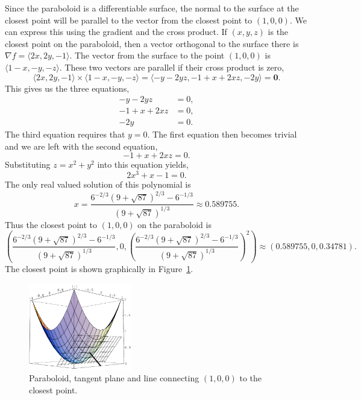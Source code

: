 \begin{Solution}
  \label{solution paraboloid closest point}
  Since the paraboloid is a differentiable surface, the normal to the surface
  at the closest point will be parallel to the vector from the closest
  point to $(1,0,0)$.  We can express this using the gradient and the 
  cross product.  If $(x,y,z)$ is the closest point on the paraboloid, then
  a vector orthogonal to the surface there is $\nabla f = \langle 2x,2y,-1 \rangle$.
  The vector from the surface to the point $(1,0,0)$ is $\langle 1-x,-y,-z \rangle$.
  These two vectors are parallel if their cross product is zero,
  \[
  \langle 2x,2y,-1 \rangle \times \langle 1-x,-y,-z \rangle 
  = \langle -y - 2 y z, -1 + x + 2 x z, -2 y \rangle = \mathbf{0}.
  \]
  This gives us the three equations,
  \begin{align*}
    -y - 2 y z &= 0, \\
    -1 + x + 2 x z &= 0, \\
    -2 y &= 0.
  \end{align*}
  The third equation requires that $y = 0$.  The first equation then becomes
  trivial and we are left with the second equation,
  \[
  -1 + x + 2 x z = 0.
  \]
  Substituting $z = x^2 + y^2$ into this equation yields,
  \[
  2 x^3 + x - 1 = 0.
  \]
  The only real valued solution of this polynomial is
  \[
  x = \frac{ 6^{-2/3} \left( 9 + \sqrt{87} \right)^{2/3} - 6^{-1/3} }
  { \left( 9 + \sqrt{87} \right)^{1/3} }
  \approx 0.589755.
  \]
  Thus the closest point to $(1,0,0)$ on the paraboloid is
  \[
  \left( \frac{ 6^{-2/3} \left( 9 + \sqrt{87} \right)^{2/3} - 6^{-1/3} }
    { \left( 9 + \sqrt{87} \right)^{1/3} }, 0,
    \left( \frac{ 6^{-2/3} \left( 9 + \sqrt{87} \right)^{2/3} - 6^{-1/3} }
      { \left( 9 + \sqrt{87} \right)^{1/3} } \right)^2 \right)
  \approx (0.589755, 0, 0.34781).
  \]
  The closest point is shown graphically in Figure~\ref{paracp}.

  \begin{figure}[h!]
    \begin{center}
      \includegraphics[width=0.4\textwidth]{calculus/vector/paracp}
    \end{center}
    \caption{Paraboloid, tangent plane and line connecting $(1,0,0)$ to
      the closest point.}
    \label{paracp}
  \end{figure}
\end{Solution}









